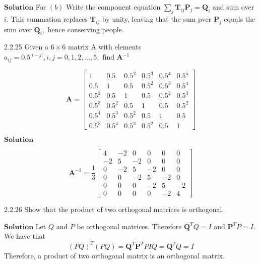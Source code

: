 \documentclass{article}
\begin{document}
\begin{flushleft}
$\boxed{\textbf{Solution}}$ For $(b)$ Write the component equation $\sum_{j} \mathbf{T}_{i j} \mathbf{P}_{j}=\mathbf{Q}_{i}$ and sum over $i.$ This summation replaces $\mathbf{T}_{i j}$ by unity, leaving that the sum pver $\mathbf{P}_{j}$ equals the sum over $\mathbf{Q}_{i},$ hence conserving people.



\begin{mybox}{2.2.25}
Given a $6 \times 6$ matrix A with elements $a_{i j}=0.5^{|i-j|}, i, j=0,1,2, \ldots, 5, \text { find } \mathbf{A}^{-1}$

$$\mathbf{A}=\begin{bmatrix}
1 & 0.5 & 0.5^2 & 0.5^3 & 0.5^4 & 0.5^5 \\ 
0.5 & 1 & 0.5 & 0.5^2 & 0.5^3 & 0.5^4 \\ 
0.5^2 & 0.5 & 1 & 0.5 & 0.5^2 & 0.5^3\\ 
0.5^3 & 0.5^2 & 0.5 & 1 & 0.5 & 0.5^2\\ 
0.5^4 & 0.5^3 & 0.5^2 & 0.5 & 1 & 0.5\\ 
0.5^5 & 0.5^4 & 0.5^3 & 0.5^2 & 0.5 & 1
\end{bmatrix}$$
\end{mybox}

$\boxed{\textbf{Solution}}$

$$\mathbf{A}^{-1}=\frac{1}{3}\begin{bmatrix}{4} & {-2} & {0} & {0} & {0} & {0} \\ {-2} & {5} & {-2} & {0} & {0} & {0} \\ {0} & {-2} & {5} & {-2} & {0} & {0} \\ {0} & {0} & {-2} & {5} & {-2} & {0} \\ {0} & {0} & {0} & {-2} & {5} & {-2} \\ {0} & {0} & {0} & {0} & {-2} & {4}\end{bmatrix}$$









\begin{mybox}{2.2.26}
Show that the product of two orthogonal matrices is orthogonal.
\end{mybox}



$\boxed{\textbf{Solution}}$ Let $Q$ and $P$ be orthogonal matrices. Therefore $\mathbf{Q}^{T} Q=I$ and $\mathbf{P}^{T} P=I .$
We have that
$$
(P Q)^{T}(P Q)=\mathbf{Q}^{T} \mathbf{P}^{T} P I Q=\mathbf{Q}^{T} Q=I
$$
Therefore, a product of two orthogonal matrix is an orthogonal matrix.














\end{flushleft}
\end{document}

